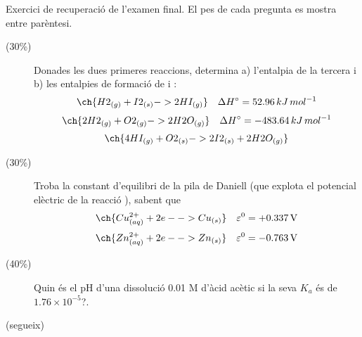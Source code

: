 \documentclass[11pt]{article}
\begin{document}
{Exercici de recuperació de l'examen final. El pes de cada pregunta es mostra entre parèntesi.
\begin{description}

\item[(30\%)] Donades les dues primeres reaccions, determina a) l'entalpia de la tercera i b) les entalpies de formació de  i :
\[\ch{H2_{(g)} + I2_{(s)} -> 2 HI_{(g)}} \quad \Delta H^{\circ} = 52.96 \, kJ \, mol^{-1}\]
\[\ch{2 H2_{(g)} + O2_{(g)} -> 2 H2O_{(g)}} \quad \Delta H^{\circ} = -483.64 \, kJ \, mol^{-1}\]
\[\ch{4 HI_{(g)} + O2_{(s)} -> 2 I2_{(s)} + 2 H2O_{(g)}}\]

\item[(30\%)] Troba la constant d'equilibri de la pila de Daniell (que explota el potencial elèctric de la reacció ), sabent que 
\[\ch{Cu^{2+}_{(aq)} + 2 e- -> Cu_{(s)}} \quad \varepsilon^0 = +0.337 \, \mathrm{V}\]
\[\ch{Zn^{2+}_{(aq)} + 2 e- -> Zn_{(s)}} \quad \varepsilon^0 = -0.763 \, \mathrm{V}\]
\item[(40\%)] Quin és el pH d'una dissolució 0.01 M d'àcid acètic si la seva $K_a$ és de $1.76 \times 10^{-5}$?.

\end{description}
}
{
\vfill 
\newpage (segueix)

}
\end{document}
